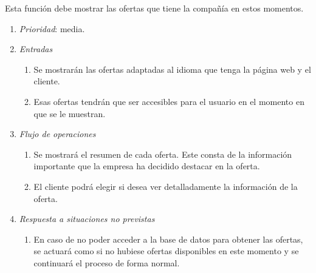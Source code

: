 	Esta función debe mostrar las ofertas que tiene la compañía en estos momentos.
	
\begin{enumerate}
	\item \textit{Prioridad}: media.
	\item \textit{Entradas}
	\begin{enumerate}
		\item Se mostrarán las ofertas adaptadas al idioma que tenga la página web y el cliente.
		\item Esas ofertas tendrán que ser accesibles para el usuario en el momento en que se le muestran.
	\end{enumerate}
	\item \textit{Flujo de operaciones}
	\begin{enumerate}
		\item Se mostrará el resumen de cada oferta. Este consta de la información importante que la empresa ha decidido destacar en la oferta. 
		\item El cliente podrá elegir si desea ver detalladamente la información de la oferta.
	\end{enumerate}
	\item \textit{Respuesta a situaciones no previstas}
	\begin{enumerate}
		\item En caso de no poder acceder a la base de datos para obtener las ofertas, se actuará como si no hubiese ofertas disponibles en este momento y se continuará el proceso de forma normal.
	\end{enumerate}
\end{enumerate}
